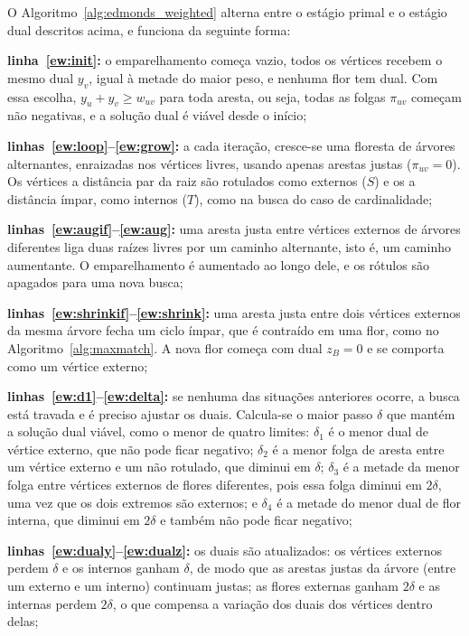 O Algoritmo~\ref{alg:edmonds_weighted} alterna entre o estágio primal e o estágio dual descritos acima, e funciona da seguinte forma:

\begin{alineas}
    \item \textbf{linha~\ref{ew:init}:} o emparelhamento começa vazio, todos os vértices recebem o mesmo dual $y_v$, igual à metade do maior peso, e nenhuma flor tem dual. Com essa escolha, $y_u + y_v \ge w_{uv}$ para toda aresta, ou seja, todas as folgas $\pi_{uv}$ começam não negativas, e a solução dual é viável desde o início;
    \item \textbf{linhas~\ref{ew:loop}--\ref{ew:grow}:} a cada iteração, cresce-se uma floresta de árvores alternantes, enraizadas nos vértices livres, usando apenas arestas justas ($\pi_{uv} = 0$). Os vértices a distância par da raiz são rotulados como externos ($S$) e os a distância ímpar, como internos ($T$), como na busca do caso de cardinalidade;
    \item \textbf{linhas~\ref{ew:augif}--\ref{ew:aug}:} uma aresta justa entre vértices externos de árvores diferentes liga duas raízes livres por um caminho alternante, isto é, um caminho aumentante. O emparelhamento é aumentado ao longo dele, e os rótulos são apagados para uma nova busca;
    \item \textbf{linhas~\ref{ew:shrinkif}--\ref{ew:shrink}:} uma aresta justa entre dois vértices externos da mesma árvore fecha um ciclo ímpar, que é contraído em uma flor, como no Algoritmo~\ref{alg:maxmatch}. A nova flor começa com dual $z_B = 0$ e se comporta como um vértice externo;
    \item \textbf{linhas~\ref{ew:d1}--\ref{ew:delta}:} se nenhuma das situações anteriores ocorre, a busca está travada e é preciso ajustar os duais. Calcula-se o maior passo $\delta$ que mantém a solução dual viável, como o menor de quatro limites: $\delta_1$ é o menor dual de vértice externo, que não pode ficar negativo; $\delta_2$ é a menor folga de aresta entre um vértice externo e um não rotulado, que diminui em $\delta$; $\delta_3$ é a metade da menor folga entre vértices externos de flores diferentes, pois essa folga diminui em $2\delta$, uma vez que os dois extremos são externos; e $\delta_4$ é a metade do menor dual de flor interna, que diminui em $2\delta$ e também não pode ficar negativo;
    \item \textbf{linhas~\ref{ew:dualy}--\ref{ew:dualz}:} os duais são atualizados: os vértices externos perdem $\delta$ e os internos ganham $\delta$, de modo que as arestas justas da árvore (entre um externo e um interno) continuam justas; as flores externas ganham $2\delta$ e as internas perdem $2\delta$, o que compensa a variação dos duais dos vértices dentro delas;

\end{alineas}
